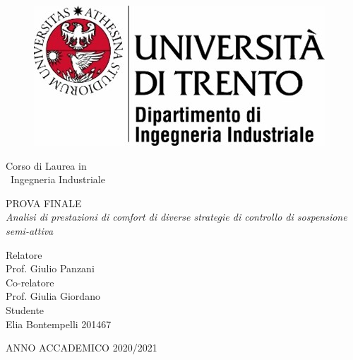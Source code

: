 \pagestyle{plain}

\thispagestyle{empty}

\begin{figure}[htbp]
	\includegraphics[scale=1.3]{figure/logo.jpg}
	\label{fig}
\end{figure}
\vspace{2 cm}
 
\begin{center}
	\LARGE{Corso di Laurea in\\		
	\centering	
	\ Ingegneria Industriale
	}
	
	\vspace{1,5 cm} 
	\LARGE\textsc{PROVA FINALE\\} 
	\vspace{1 cm} 
	\LARGE\textit{Analisi di prestazioni di comfort di diverse strategie di controllo di sospensione semi-attiva\\}
	
	\vspace{1.5 cm} 
\end{center}


\begin{flushleft}
	\Large{Relatore}\\
	\Large{Prof. Giulio Panzani}\\
	\vspace{1.5 cm}
	\Large{Co-relatore}\\
	\Large{Prof. Giulia Giordano}\\
	\vspace{1.5 cm}
	\Large{Studente}\\
	\Large{Elia Bontempelli 201467}\\
\end{flushleft}


\begin{center}
	\vfill
	\Large{ANNO ACCADEMICO 2020/2021}
\end{center}
